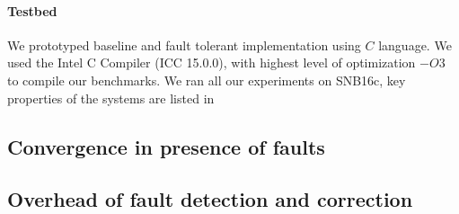 \paragraph{Testbed}

We prototyped baseline and fault tolerant implementation using $C$ language. 
We used the Intel C Compiler (ICC 15.0.0), with highest level of
 optimization $-O3$ to compile our benchmarks.
We ran all our experiments on SNB16c, key properties of the systems are listed in~


\subsection{Convergence in presence of faults}


\subsection{Overhead of fault detection and correction}

